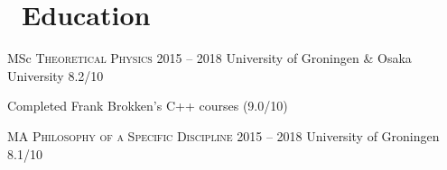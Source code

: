 \section{\faBook\ Education}

\educationEntry
  {MSc \textsc{Theoretical Physics}}
  {2015 -- 2018}
  {University of Groningen \& Osaka University}
  {8.2/10}
  {
    \item Completed Frank Brokken's C++ courses (9.0/10)
  }

\educationEntryShort
    {MA \textsc{Philosophy of a Specific Discipline}}
    {2015 -- 2018}
    {University of Groningen}
    {8.1/10}



